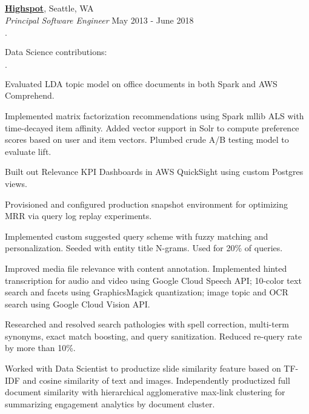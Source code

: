 \documentclass[11pt]{article}
\newenvironment{achievements}{\begin{list}{\bf \Large $\cdot$}{\topsep 2pt \itemsep 0pt}}{\vspace*{3pt}\end{list}}
\newenvironment{achievements2}{\begin{list}{\bf \Large $\cdot$}{\topsep 2pt \itemsep 0pt \leftmargin 12pt }}{\vspace*{3pt}\end{list}}
\begin{document}
\href{http://www.highspot.com}{\bf Highspot}, Seattle, WA \\
{\em Principal Software Engineer} \hfill May 2013 - June 2018
  \begin{achievements}

  \item[] Data Science contributions:
    \begin{achievements2}


    \item Evaluated LDA topic model on office documents in both Spark and AWS
      Comprehend.

    \item Implemented matrix factorization recommendations using Spark mllib
      ALS with time-decayed item affinity.  Added vector support in Solr to
      compute preference scores based on user and item vectors.  Plumbed crude
      A/B testing model to evaluate lift.

    \item Built out Relevance KPI Dashboards in AWS QuickSight using custom
      Postgres views.

    \item Provisioned and configured production snapshot environment for
      optimizing MRR via query log replay experiments.

    \item Implemented custom suggested query scheme with fuzzy matching and
      personalization.  Seeded with entity title N-grams.  Used for 20\% of
      queries.

    \item Improved media file relevance with content annotation.  Implemented
      hinted transcription for audio and video using Google Cloud Speech API;
      10-color text search and facets using GraphicsMagick quantization; image
      topic and OCR search using Google Cloud Vision API.

    \item Researched and resolved search pathologies with spell correction,
      multi-term synonyms, exact match boosting, and query sanitization.
      Reduced re-query rate by more than 10\%.

 
    \item Worked with Data Scientist to productize slide similarity feature
      based on TF-IDF and cosine similarity of text and images.  Independently
      productized full document similarity with hierarchical agglomerative
      max-link clustering for summarizing engagement analytics by document
      cluster.


\end{achievements2}
\end{achievements}
\end{document}
